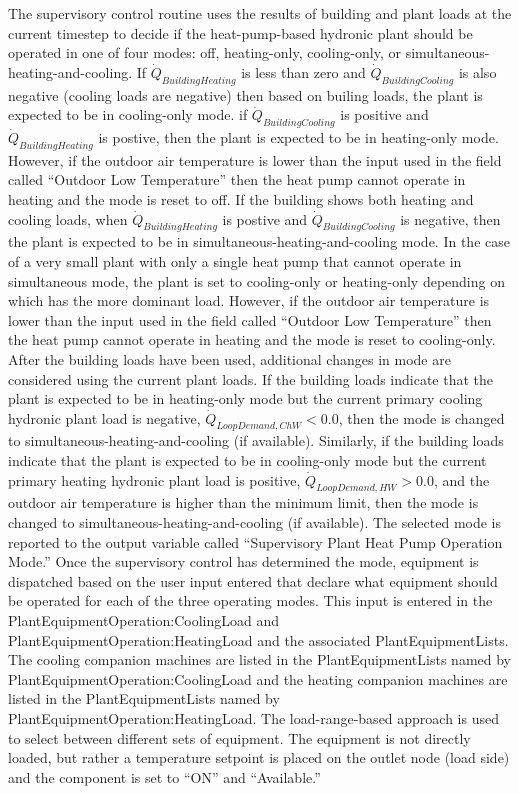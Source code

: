 The supervisory control routine uses the results of building and plant loads at the current timestep to decide if the heat-pump-based hydronic plant should be operated in one of four modes: off, heating-only, cooling-only, or simultaneous-heating-and-cooling. If $\dot Q_{BuildingHeating}$ is less than zero and $\dot Q_{BuildingCooling}$ is also negative (cooling loads are negative) then based on builing loads, the plant is expected to be in cooling-only mode.  if $\dot Q_{BuildingCooling}$ is positive and $\dot Q_{BuildingHeating}$ is postive, then the plant is expected to be in heating-only mode. However, if the outdoor air temperature is lower than the input used in the field called ``Outdoor Low Temperature'' then the heat pump cannot operate in heating and the mode is reset to off. If the building shows both heating and cooling loads, when $\dot Q_{BuildingHeating}$ is postive and $\dot Q_{BuildingCooling}$ is negative, then the plant is expected to be in simultaneous-heating-and-cooling mode.  In the case of a very small plant with only a single heat pump that cannot operate in simultaneous mode, the plant is set to cooling-only or heating-only depending on which has the more dominant load. However, if the outdoor air temperature is lower than the input used in the field called ``Outdoor Low Temperature'' then the heat pump cannot operate in heating and the mode is reset to cooling-only. After the building loads have been used, additional changes in mode are considered using the current plant loads. If the building loads indicate that the plant is expected to be in heating-only mode but the current primary cooling hydronic plant load is negative, $\dot Q_{LoopDemand, ChW} < 0.0$, then the mode is changed to simultaneous-heating-and-cooling (if available). Similarly, if the building loads indicate that the plant is expected to be in cooling-only mode but the current primary heating hydronic plant load is positive, $\dot Q_{LoopDemand, HW} > 0.0$, and the outdoor air temperature is higher than the minimum limit, then the mode is changed to simultaneous-heating-and-cooling (if available).  The selected mode is reported to the output variable called ``Supervisory Plant Heat Pump Operation Mode.''
Once the supervisory control has determined the mode, equipment is dispatched based on the user input entered that declare what equipment should be operated for each of the three operating modes.  This input is entered in the PlantEquipmentOperation:CoolingLoad and PlantEquipmentOperation:HeatingLoad and the associated PlantEquipmentLists.  The cooling companion machines are listed in the PlantEquipmentLists named by PlantEquipmentOperation:CoolingLoad and the heating companion machines are listed in the PlantEquipmentLists named by PlantEquipmentOperation:HeatingLoad. The load-range-based approach is used to select between different sets of equipment.  The equipment is not directly loaded, but rather a temperature setpoint is placed on the outlet node (load side) and the component is set to ``ON'' and ``Available.''  
